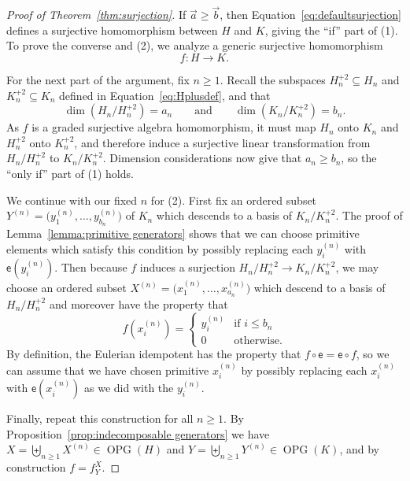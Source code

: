 \documentclass[11pt]{amsart}
\theoremstyle{definition}
\numberwithin{equation}{section}
\newcommand{\OPG}{\operatorname{OPG}}
\begin{document}
\begin{proof}[Proof of Theorem~\ref{thm:surjection}]
If $\vec{a} \ge \vec{b}$, then Equation~\eqref{eq:defaultsurjection} defines a surjective homomorphism between $H$ and $K$, giving the ``if'' part of (1).  To prove the converse and (2), we analyze a generic surjective homomorphism
\[
f: H \to K.
\]

For the next part of the argument, fix $n \ge 1$.  
Recall the subspaces $H_{n}^{+2} \subseteq H_{n}$ and $K^{+2}_{n} \subseteq K_{n}$ defined in Equation~\eqref{eq:Hplusdef}, and that 
\[
\dim(H_{n} / H_{n}^{+2}) = a_{n}
\qquad\text{and}\qquad
\dim(K_{n} / K_{n}^{+2}) = b_{n}.
\]
As $f$ is a graded surjective algebra homomorphism, it must map $H_{n}$ onto $K_{n}$ and $H_{n}^{+2}$ onto $K_{n}^{+2}$, and therefore induce a surjective linear transformation from $H_{n} / H_{n}^{+2}$ to $K_{n} / K_{n}^{+2}$.  Dimension considerations now give that $a_{n} \ge b_{n}$, so the ``only if'' part of (1) holds.  

We continue with our fixed $n$ for (2).  
First fix an ordered subset $Y^{(n)} = \big( y^{(n)}_{1}, \ldots, y^{(n)}_{b_{n}} \big)$ of $K_{n}$ which descends to a basis of $K_{n} / K_{n}^{+2}$.  
The proof of Lemma~\ref{lemma:primitive generators} shows that we can choose primitive elements which satisfy this condition by possibly replacing each $y^{(n)}_{i}$ with $\mathsf{e}(y^{(n)}_{i})$.  
Then because $f$ induces a surjection $H_{n} / H_{n}^{+2} \to K_{n} / K_{n}^{+2}$, we may choose an ordered subset $X^{(n)} = \big( x^{(n)}_{1}, \ldots, x^{(n)}_{a_{n}} \big)$ which descend to a basis of $H_{n}/H^{+2}_{n}$ and moreover have the property that
\[
f(x^{(n)}_{i}) = \begin{cases} y^{(n)}_{i} & \text{if $i \le b_{n}$} \\ 0 & \text{otherwise.} \end{cases}
\]
By definition, the Eulerian idempotent has the property that $f \circ \mathsf{e} = \mathsf{e} \circ f$, so we can assume that we have chosen primitive $x^{(n)}_{i}$ by possibly replacing each $x^{(n)}_{i}$ with $\mathsf{e}(x^{(n)}_{i})$ as we did with the $y^{(n)}_{i}$.

Finally, repeat this construction for all $n \ge 1$.  By Proposition~\ref{prop:indecomposable generators} we have $X = \biguplus_{n \ge 1} X^{(n)} \in \OPG(H)$ and $Y = \biguplus_{n \ge 1} Y^{(n)} \in \OPG(K)$, and by construction $f = f^{X}_{Y}$.
\end{proof}
\end{document}
